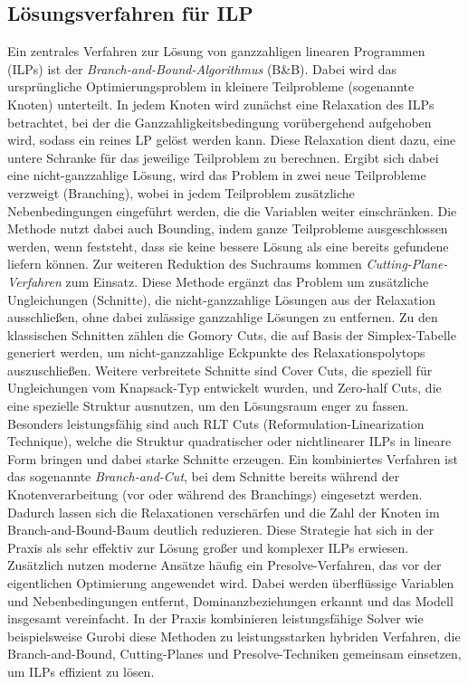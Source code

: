 \documentclass[bachelor, german]{algothesis}
\begin{document}
\subsection{Lösungsverfahren für ILP}
Ein zentrales Verfahren zur Lösung von ganzzahligen linearen Programmen (ILPs) ist der \emph{Branch-and-Bound-Algorithmus} (B\&B). Dabei wird das ursprüngliche Optimierungsproblem in kleinere Teilprobleme (sogenannte Knoten) unterteilt. In jedem Knoten wird zunächst eine Relaxation des ILPs betrachtet, bei der die Ganzzahligkeitsbedingung vorübergehend aufgehoben wird, sodass ein reines LP gelöst werden kann. Diese Relaxation dient dazu, eine untere Schranke für das jeweilige Teilproblem zu berechnen. Ergibt sich dabei eine nicht-ganzzahlige Lösung, wird das Problem in zwei neue Teilprobleme verzweigt (Branching), wobei in jedem Teilproblem zusätzliche Nebenbedingungen eingeführt werden, die die Variablen weiter einschränken. Die Methode nutzt dabei auch Bounding, indem ganze Teilprobleme ausgeschlossen werden, wenn feststeht, dass sie keine bessere Lösung als eine bereits gefundene liefern können.\newline
Zur weiteren Reduktion des Suchraums kommen \emph{Cutting-Plane-Verfahren} zum Einsatz. Diese Methode ergänzt das Problem um zusätzliche Ungleichungen (Schnitte), die nicht-ganzzahlige Lösungen aus der Relaxation ausschließen, ohne dabei zulässige ganzzahlige Lösungen zu entfernen. Zu den klassischen Schnitten zählen die Gomory Cuts, die auf Basis der Simplex-Tabelle generiert werden, um nicht-ganzzahlige Eckpunkte des Relaxationspolytops auszuschließen. Weitere verbreitete Schnitte sind Cover Cuts, die speziell für Ungleichungen vom Knapsack-Typ entwickelt wurden, und Zero-half Cuts, die eine spezielle Struktur ausnutzen, um den Lösungsraum enger zu fassen. Besonders leistungsfähig sind auch RLT Cuts (Reformulation-Linearization Technique), welche die Struktur quadratischer oder nichtlinearer ILPs in lineare Form bringen und dabei starke Schnitte erzeugen.\newline
Ein kombiniertes Verfahren ist das sogenannte \emph{Branch-and-Cut}, bei dem Schnitte bereits während der Knotenverarbeitung (vor oder während des Branchings) eingesetzt werden. Dadurch lassen sich die Relaxationen verschärfen und die Zahl der Knoten im Branch-and-Bound-Baum deutlich reduzieren. Diese Strategie hat sich in der Praxis als sehr effektiv zur Lösung großer und komplexer ILPs erwiesen.\newline
Zusätzlich nutzen moderne Ansätze häufig ein Presolve-Verfahren, das vor der eigentlichen Optimierung angewendet wird. Dabei werden überflüssige Variablen und Nebenbedingungen entfernt, Dominanzbeziehungen erkannt und das Modell insgesamt vereinfacht.\newline
In der Praxis kombinieren leistungsfähige Solver wie beispielsweise Gurobi\cite{Gurobi2025} diese Methoden zu leistungsstarken hybriden Verfahren, die Branch-and-Bound, Cutting-Planes und Presolve-Techniken gemeinsam einsetzen, um ILPs effizient zu lösen.
\end{document}

